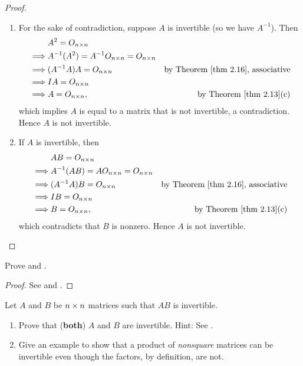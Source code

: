 \begin{proof} \ 
\begin{enumerate}
\item For the sake of contradiction, suppose \(A\) is invertible (so we have \(A^{-1}\)).
Then
\begin{align*}
             & A^2 = O_{n \X n} \\
    \implies & A^{-1} (A^2) = A^{-1} O_{n \X n} = O_{n \X n} \\
    \implies & (A^{-1} A) A = O_{n \X n} & \text{by \THM{2.16}, associative} \\
    \implies & IA = O_{n \X n} \\
    \implies & A = O_{n \X n}, & \text{by \THM{2.13}(c)}
\end{align*}
which implies \(A\) is equal to a matrix that is not invertible, a contradiction.
Hence \(A\) is not invertible.

\item
If \(A\) is invertible, then
\begin{align*}
             & AB = O_{n \X n} \\
    \implies & A^{-1} (AB) = A O_{n \X n} = O_{n \X n} \\
    \implies & (A^{-1} A)B = O_{n \X n} & \text{by \THM{2.16}, associative} \\
    \implies & IB = O_{n \X n} \\
    \implies & B = O_{n \X n}, & \text{by \THM{2.13}(c)}
\end{align*}
which contradicts that \(B\) is nonzero.
Hence \(A\) is not invertible.
\end{enumerate}
\end{proof}

\begin{exercise} \label{exercise 2.4.8}
Prove  and .
\end{exercise}

\begin{proof}
See \CORO{2.18.1} and \CORO{2.18.2}.
\end{proof}

\begin{exercise} \label{exercise 2.4.9}
Let \(A\) and \(B\) be \(n \times n\) matrices such that \(AB\) is invertible.
\begin{enumerate}
\item Prove that (\textbf{both}) \(A\) and \(B\) are invertible.
    Hint: See \ATHM{2.26}.
\item Give an example to show that a product of \emph{nonsquare} matrices can be invertible even though the factors, by definition, are not.
\end{enumerate}
\end{exercise}

